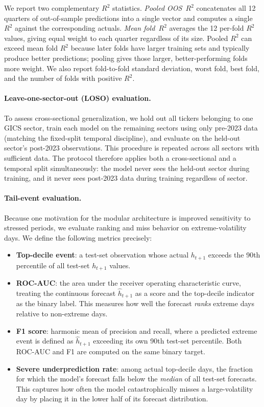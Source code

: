 \documentclass[review]{elsarticle}
\begin{document}
We report two complementary $R^2$ statistics. \emph{Pooled OOS~$R^2$} concatenates all 12 quarters of out-of-sample predictions into a single vector and computes a single $R^2$ against the corresponding actuals. \emph{Mean fold~$R^2$} averages the 12 per-fold $R^2$ values, giving equal weight to each quarter regardless of its size. Pooled $R^2$ can exceed mean fold $R^2$ because later folds have larger training sets and typically produce better predictions; pooling gives those larger, better-performing folds more weight. We also report fold-to-fold standard deviation, worst fold, best fold, and the number of folds with positive $R^2$.

\paragraph{Leave-one-sector-out (LOSO) evaluation.}
To assess cross-sectional generalization, we hold out all tickers belonging to one GICS sector, train each model on the remaining sectors using only pre-2023 data (matching the fixed-split temporal discipline), and evaluate on the held-out sector's post-2023 observations. This procedure is repeated across all sectors with sufficient data. The protocol therefore applies both a cross-sectional and a temporal split simultaneously: the model never sees the held-out sector during training, and it never sees post-2023 data during training regardless of sector.

\paragraph{Tail-event evaluation.}
Because one motivation for the modular architecture is improved sensitivity to stressed periods, we evaluate ranking and miss behavior on extreme-volatility days. We define the following metrics precisely:

\begin{itemize}[nosep]
    \item \textbf{Top-decile event}: a test-set observation whose actual $h_{t+1}$ exceeds the 90th percentile of all test-set $h_{t+1}$ values.
    \item \textbf{ROC-AUC}: the area under the receiver operating characteristic curve, treating the continuous forecast $\widehat{h}_{t+1}$ as a score and the top-decile indicator as the binary label. This measures how well the forecast \emph{ranks} extreme days relative to non-extreme days.
    \item \textbf{F1 score}: harmonic mean of precision and recall, where a predicted extreme event is defined as $\widehat{h}_{t+1}$ exceeding its own 90th test-set percentile. Both ROC-AUC and F1 are computed on the same binary target.
    \item \textbf{Severe underprediction rate}: among actual top-decile days, the fraction for which the model's forecast falls below the \emph{median} of all test-set forecasts. This captures how often the model catastrophically misses a large-volatility day by placing it in the lower half of its forecast distribution.
\end{itemize}
\end{document}
